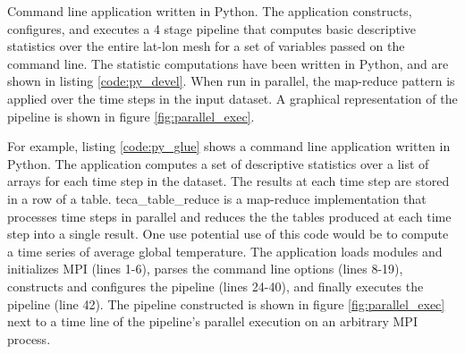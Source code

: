 \documentclass[a4paper,10pt,DIV=12]{scrreprt}
\begin{document}
\begin{listing}[h]
\begin{center}
\vspace{1mm}
\begin{minipage}{0.8\textwidth}
\inputminted[fontsize=\footnotesize, linenos]{python}{source/stats.py}
\caption{\small Command line application written in Python. The application constructs, configures, and executes a 4 stage pipeline that computes basic descriptive statistics over the entire lat-lon mesh for a set of variables passed on the command line. The statistic computations have been written in Python, and are shown in listing \ref{code:py_devel}. When run in parallel, the map-reduce pattern is applied over the time steps in the input dataset. A graphical representation of the pipeline is shown in figure \ref{fig:parallel_exec}.}
\label{code:py_glue}
\end{minipage}
\end{center}
\end{listing}

For example, listing \ref{code:py_glue} shows a command line application written in Python. The application computes a set of descriptive statistics over a list of arrays for each time step in the dataset. The results at each time step are stored in a row of a table. teca\_table\_reduce is a map-reduce implementation that processes time steps in parallel and reduces the the tables produced at each time step into a single result. One use potential use of this code would be to compute a time series of average global temperature. The application loads modules and initializes MPI (lines 1-6), parses the command line options (lines 8-19),  constructs and configures the pipeline (lines 24-40), and finally executes the pipeline (line 42). The pipeline constructed is shown in figure \ref{fig:parallel_exec} next to a time line of the pipeline's parallel execution on an arbitrary MPI process.

\end{document}
